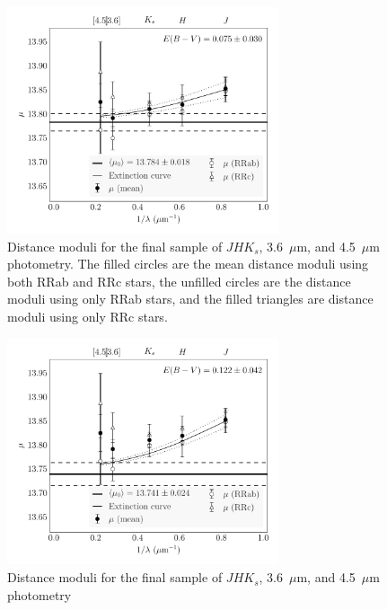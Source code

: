 \documentclass[a4paper,fleqn,usenatbib]{mnras}
\begin{document}
\begin{figure}
\begin{center}
\includegraphics[width=80mm]{reworked_fitting_code/final_plots/multiwavelength_distance_m4_clipped_mean.pdf}
\caption{Distance moduli for the final sample of $J\!H\!K_s$, 3.6~$\mu$m, and 4.5~$\mu$m photometry. The filled circles are the mean distance moduli using both RRab and RRc stars, the unfilled circles are the distance moduli using only RRab stars, and the filled triangles are distance moduli using only RRc stars.}
\label{fig:omegaCen_dist_m4_mean}
\end{center}
\end{figure}

\begin{figure}
\begin{center}
\includegraphics[width=80mm]{reworked_fitting_code/final_plots/multiwavelength_distance_m4_clipped_ab.pdf}
\caption{Distance moduli for the final sample of $J\!H\!K_s$, 3.6~$\mu$m, and 4.5~$\mu$m photometry}
\label{fig:omegaCen_dist_m4_mean}
\end{center}
\end{figure}

\end{document}

